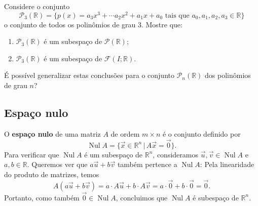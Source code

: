 \begin{exer}
	Considere o conjunto
	\begin{equation}
	\mathcal{P}_3 (\mathbb{R}) = \{ p(x) = a_3 x^3 + \cdots a_2 x^2 + a_1 x + a_0 \text{ tais que } a_0, a_1, a_2, a_3 \in \mathbb{R} \}
	\end{equation} o conjunto de todos os polinômios de grau 3. Mostre que:
	\begin{enumerate}
		\item $\mathcal{P}_3 (\mathbb{R})$ é um subespaço de $\mathcal{P} (\mathbb{R})$;
		\item $\mathcal{P}_3 (\mathbb{R})$ é um subespaço de $\mathcal{F} (I;\mathbb{R})$.
	\end{enumerate} É possível generalizar estas conclusões para o conjunto $\mathcal{P}_n (\mathbb{R})$ dos polinômios de grau $n$?
\end{exer}


\subsection{Espaço nulo}

O \textbf{espaço nulo} de uma matriz $A$ de ordem $m \times n$ é o conjunto definido por
\begin{equation}
\operatorname{Nul} A = \big\{ \vec{x} \in \mathbb{R}^n \, | \, A\vec{x} = \vec{0}  \big\}.
\end{equation} Para verificar que $\operatorname{Nul} A$ é um subespaço de $\mathbb{R}^n$, consideramos $\vec{u}, \vec{v} \in \operatorname{Nul} A$ e $a,b \in \mathbb{R}$. Queremos ver que $a\vec{u} + b\vec{v}$ também pertence a $\operatorname{Nul} A$: Pela linearidade do produto de matrizes, temos
\begin{equation}
A (a\vec{u} + b\vec{v}) = a \cdot A\vec{u} + b\cdot A\vec{v} = a\cdot \vec{0} + b \cdot \vec{0} = \vec{0}.
\end{equation} Portanto, como também $\vec{0} \in \operatorname{Nul} A$, concluimos que $\operatorname{Nul} A$ é subespaço de $\mathbb{R}^n$.

